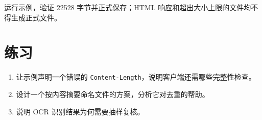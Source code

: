 \begin{tcolorbox}[title=本章验收,colframe=Teal,colback=Teal!3]
运行示例，验证 22528 字节并正式保存；HTML 响应和超出大小上限的文件均不得生成正式文件。
\end{tcolorbox}

\section{练习}
\begin{enumerate}[label=\arabic*.]
\item 让示例声明一个错误的 \texttt{Content-Length}，说明客户端还需哪些完整性检查。
\item 设计一个按内容摘要命名文件的方案，分析它对去重的帮助。
\item 说明 OCR 识别结果为何需要抽样复核。
\end{enumerate}
